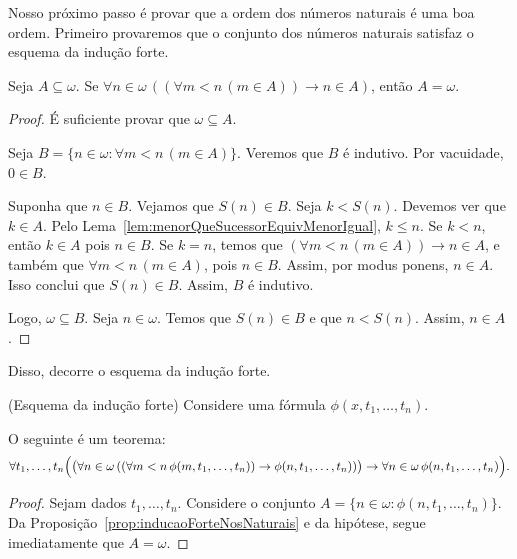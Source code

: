 Nosso próximo passo é provar que a ordem dos números naturais é uma boa ordem.
Primeiro provaremos que o conjunto dos números naturais satisfaz o esquema da indução forte.

\begin{proposition}[$Z^--P$]\label{prop:inducaoForteNosNaturais}
    Seja $A\subseteq \omega$.
    Se $\forall n \in \omega\, ((\forall m < n\, (m \in A)) \rightarrow n \in A)$, então $A = \omega$.
\end{proposition}
\begin{proof}
    É suficiente provar que $\omega \subseteq A$.

    Seja $B=\{n \in \omega : \forall m < n\, (m \in A)\}$.
    Veremos que $B$ é indutivo.
    Por vacuidade, $0\in B$.
    
    Suponha que $n \in B$.
    Vejamos que $S(n) \in B$.
    Seja $k < S(n)$.
    Devemos ver que $k \in A$.
    Pelo Lema~\ref{lem:menorQueSucessorEquivMenorIgual}, $k \leq n$.
    Se $k<n$, então $k \in A$ pois $n \in B$.
    Se $k=n$, temos que $(\forall m < n\, (m \in A))\rightarrow n \in A$, e também que $\forall m < n\, (m \in A)$, pois $n \in B$.
    Assim, por modus ponens, $n \in A$.
    Isso conclui que $S(n) \in B$.
    Assim, $B$ é indutivo.

    Logo, $\omega \subseteq B$.
    Seja $n \in \omega$.
    Temos que $S(n) \in B$ e que $n < S(n)$.
    Assim, $n \in A$.
\end{proof}

Disso, decorre o esquema da indução forte.
\begin{proposition}[$Z^--P$](Esquema da indução forte)\label{prop:esquemaDaInducaoForte}
    Considere uma fórmula $\phi(x, t_1, \dots, t_n)$.

    O seguinte é um teorema:
    \[
    \forall t_1, \dots, t_n \Bigl(
        \bigl(
            \forall n \in \omega\, ((\forall m < n\, \phi(m, t_1, \dots, t_n)) \rightarrow \phi(n, t_1, \dots, t_n))
        \bigr)
        \rightarrow
        \forall n \in \omega\, \phi(n, t_1, \dots, t_n)
    \Bigr).
    \]
\end{proposition}
\begin{proof}
    Sejam dados $t_1, \dots, t_n$.
    Considere o conjunto $A = \{n \in \omega : \phi(n, t_1, \dots, t_n)\}$.
    Da Proposição~\ref{prop:inducaoForteNosNaturais} e da hipótese, segue imediatamente que $A=\omega$.
\end{proof}

